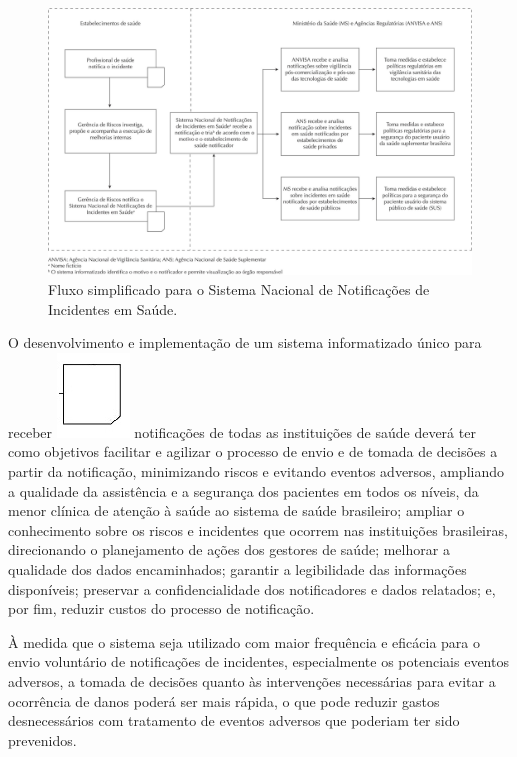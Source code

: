\documentclass{article}
\begin{document}
\begin{figure}
\includegraphics[width=\textwidth]{0034-8910-rsp-47-04-0791-gf01.jpg}
\caption{Fluxo simplificado para o Sistema Nacional de Notificações de
Incidentes em
Saúde.}\label{fig:f01}
\end{figure}

O desenvolvimento e implementação de um sistema informatizado único para receber
\includegraphics[height=.8\baselineskip]{0034-8910-rsp-47-04-0791-g1.jpg}
notificações de todas as instituições de saúde deverá ter como objetivos
facilitar e
agilizar o processo de envio e de tomada de decisões a partir da notificação,
minimizando
riscos e evitando eventos adversos, ampliando a qualidade da assistência e a
segurança dos
pacientes em todos os níveis, da menor clínica de atenção à saúde ao sistema de
saúde
brasileiro; ampliar o conhecimento sobre os riscos e incidentes que ocorrem nas
instituições
brasileiras, direcionando o planejamento de ações dos gestores de saúde;
melhorar a
qualidade dos dados encaminhados; garantir a legibilidade das informações
disponíveis;
preservar a confidencialidade dos notificadores e dados relatados; e, por fim,
reduzir
custos do processo de notificação.

À medida que o sistema seja utilizado com maior frequência e eficácia para o
envio
voluntário de notificações de incidentes, especialmente os potenciais eventos
adversos, a
tomada de decisões quanto às intervenções necessárias para evitar a ocorrência
de danos
poderá ser mais rápida, o que pode reduzir gastos desnecessários com tratamento
de eventos
adversos que poderiam ter sido prevenidos.
\end{document}
